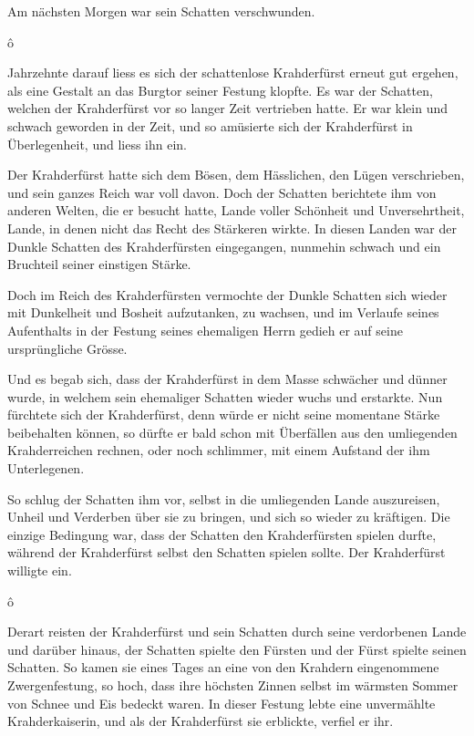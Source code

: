 \documentclass[10pt, a4paper, oneside]{book}
\newcommand{\trennzeichen}{%
        \begin{center}%
            \vspace*{-1em}
            \andorfont\Huge{ô}
        \end{center}
    }
\begin{document}
Am nächsten Morgen war sein Schatten verschwunden.



\trennzeichen



Jahrzehnte darauf liess es sich der schattenlose Krahderfürst erneut gut ergehen, als eine Gestalt an das Burgtor seiner Festung klopfte. Es war der Schatten, welchen der Krahderfürst vor so langer Zeit vertrieben hatte. Er war klein und schwach geworden in der Zeit, und so amüsierte sich der Krahderfürst in Überlegenheit, und liess ihn ein.

Der Krahderfürst hatte sich dem Bösen, dem Hässlichen, den Lügen verschrieben, und sein ganzes Reich war voll davon. Doch der Schatten berichtete ihm von anderen Welten, die er besucht hatte, Lande voller Schönheit und Unversehrtheit, Lande, in denen nicht das Recht des Stärkeren wirkte. In diesen Landen war der Dunkle Schatten des Krahderfürsten eingegangen, nunmehin schwach und ein Bruchteil seiner einstigen Stärke.

Doch im Reich des Krahderfürsten vermochte der Dunkle Schatten sich wieder mit Dunkelheit und Bosheit aufzutanken, zu wachsen, und im Verlaufe seines Aufenthalts in der Festung seines ehemaligen Herrn gedieh er auf seine ursprüngliche Grösse.

Und es begab sich, dass der Krahderfürst in dem Masse schwächer und dünner wurde, in welchem sein ehemaliger Schatten wieder wuchs und erstarkte. Nun fürchtete sich der Krahderfürst, denn würde er nicht seine momentane Stärke beibehalten können, so dürfte er bald schon mit Überfällen aus den umliegenden Krahderreichen rechnen, oder noch schlimmer, mit einem Aufstand der ihm Unterlegenen.

So schlug der Schatten ihm vor, selbst in die umliegenden Lande auszureisen, Unheil und Verderben über sie zu bringen, und sich so wieder zu kräftigen. Die einzige Bedingung war, dass der Schatten den Krahderfürsten spielen durfte, während der Krahderfürst selbst den Schatten spielen sollte. Der Krahderfürst willigte ein.



\trennzeichen



Derart reisten der Krahderfürst und sein Schatten durch seine verdorbenen Lande und darüber hinaus, der Schatten spielte den Fürsten und der Fürst spielte seinen Schatten. So kamen sie eines Tages an eine von den Krahdern eingenommene Zwergenfestung, so hoch, dass ihre höchsten Zinnen selbst im wärmsten Sommer von Schnee und Eis bedeckt waren. In dieser Festung lebte eine unvermählte Krahderkaiserin, und als der Krahderfürst sie erblickte, verfiel er ihr.
\end{document}
